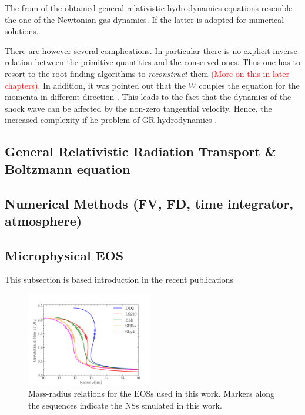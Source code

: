 \documentclass[11pt,a4paper,headinclude=true,DIV=14,BCOR=8mm,chapterprefix,listof=totoc,twoside,openright,abstracton]{scrbook}
\newcommand{\red}[1]{\textcolor{red}{#1}}
\begin{document}
The from of the obtained general relativistic hydrodynamics equations resemble the one of the Newtonian gas dynamics. If the latter is adopted for numerical solutions. 

There are however several complications. In particular there is no explicit inverse relation between the primitive quantities and the conserved ones. Thus one has to resort to the root-finding algorithms to \textit{reconstruct} them \red{(More on this in later chapters)}. In addition, it was pointed out that the $W$ couples the equation for the momenta in different direction \cite{Pons:2000,Rezzolla:2002ra,Rezzolla:2002cc,Aloy:2006rd}. This leads to the fact that the dynamics of the shock wave can be affected by the non-zero tangential velocity. Hence, the increased complexity if he problem of GR hydrodynamics \cite{Mignone:2005ns,Zhang:2005qy}.


\subsection{General Relativistic Radiation Transport \& Boltzmann equation}

\subsection{Numerical Methods (FV, FD, time integrator, atmosphere)}

\subsection{Microphysical EOS}



This subsection is based introduction in the recent publications 
\cite{Radice:2018pdn,Perego:2019adq,Bernuzzi:2020txg,Nedora:2020pak}

\begin{figure}[t]
    \centering 
    \includegraphics[width=0.49\textwidth]{./figs/tov_mr.pdf}
    \caption{Mass-radius relations for the EOSs used in this work. 
        Markers along the sequences indicate the NSs smulated in this work.}  
    \label{fig:method:tov_mr}
\end{figure}
\end{document}
